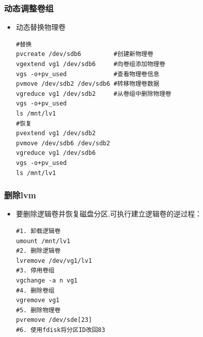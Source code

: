\documentclass[xcolor=svgnames,presentation]{beamer}
\begin{document}
\begin{frame}[fragile]
\frametitle{动态调整卷组}
\label{sec-5-8}
\begin{itemize}

\item 动态替换物理卷\\
\label{sec-5-8-1}%
\begin{verbatim}
#替换
pvcreate /dev/sdb6         #创建新物理卷
vgextend vg1 /dev/sdb6     #向卷组添加物理卷
vgs -o+pv_used             #查看物理卷信息
pvmove /dev/sdb2 /dev/sdb6 #转移物理卷数据
vgreduce vg1 /dev/sdb2     #从卷组中删除物理卷
vgs -o+pv_used
ls /mnt/lv1
#恢复
pvextend vg1 /dev/sdb2
pvmove /dev/sdb6 /dev/sdb2
vgreduce vg1 /dev/sdb6
vgs -o+pv_used
ls /mnt/lv1
\end{verbatim}
\end{itemize} %
\end{frame}
\begin{frame}[fragile]
\frametitle{删除lvm}
\label{sec-5-9}
\begin{itemize}

\item 要删除逻辑卷并恢复磁盘分区,可执行建立逻辑卷的逆过程：\\
\label{sec-5-9-1}%
\begin{verbatim}
#1. 卸载逻辑卷
umount /mnt/lv1
#2. 删除逻辑卷
lvremove /dev/vg1/lv1
#3. 停用卷组
vgchange -a n vg1
#4. 删除卷组
vgremove vg1
#5. 删除物理卷
pvremove /dev/sde[23]
#6. 使用fdisk将分区ID改回83
\end{verbatim}
\end{itemize} %
\end{frame}
\end{document}
